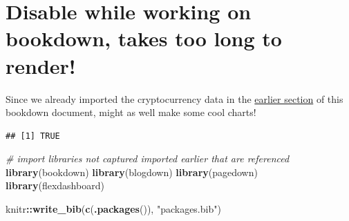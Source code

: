 \documentclass[
]{book}
\newenvironment{Shaded}{\begin{snugshade}}{\end{snugshade}}
\newcommand{\CommentTok}[1]{\textcolor[rgb]{0.56,0.35,0.01}{\textit{#1}}}
\newcommand{\KeywordTok}[1]{\textcolor[rgb]{0.13,0.29,0.53}{\textbf{#1}}}
\newcommand{\NormalTok}[1]{#1}
\newcommand{\OperatorTok}[1]{\textcolor[rgb]{0.81,0.36,0.00}{\textbf{#1}}}
\newcommand{\StringTok}[1]{\textcolor[rgb]{0.31,0.60,0.02}{#1}}
\begin{document}
\hypertarget{disable-while-working-on-bookdown-takes-too-long-to-render}{%
\section{Disable while working on bookdown, takes too long to render!}\label{disable-while-working-on-bookdown-takes-too-long-to-render}}

Since we already imported the cryptocurrency data in the \href{}{earlier section} of this bookdown document, might as well make some cool charts!

\begin{verbatim}
## [1] TRUE
\end{verbatim}

\begin{Shaded}
\begin{Highlighting}[]
\CommentTok{# import libraries not captured imported earlier that are referenced}
\KeywordTok{library}\NormalTok{(bookdown)}
\KeywordTok{library}\NormalTok{(blogdown)}
\KeywordTok{library}\NormalTok{(pagedown)}
\KeywordTok{library}\NormalTok{(flexdashboard)}
\end{Highlighting}
\end{Shaded}

\begin{Shaded}
\begin{Highlighting}[]
\NormalTok{knitr}\OperatorTok{::}\KeywordTok{write_bib}\NormalTok{(}\KeywordTok{c}\NormalTok{(}\KeywordTok{.packages}\NormalTok{()), }\StringTok{"packages.bib"}\NormalTok{)}
\end{Highlighting}
\end{Shaded}

  
\end{document}
